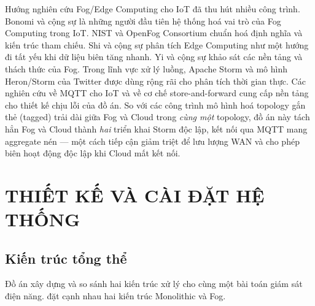 \documentclass[13pt,a4paper]{report}
\begin{document}
Hướng nghiên cứu Fog/Edge Computing cho IoT đã thu hút nhiều công trình. Bonomi
và cộng sự \cite{bonomi2012} là những người đầu tiên hệ thống hoá vai trò của Fog
Computing trong IoT. NIST \cite{nist2018} và OpenFog Consortium
\cite{openfog2017} chuẩn hoá định nghĩa và kiến trúc tham chiếu. Shi và cộng sự
\cite{shi2016} phân tích Edge Computing như một hướng đi tất yếu khi dữ liệu biên
tăng nhanh. Yi và cộng sự \cite{yi2015} khảo sát các nền tảng và thách thức của
Fog. Trong lĩnh vực xử lý luồng, Apache Storm \cite{storm} và mô hình
Heron/Storm của Twitter \cite{toshniwal2014} được dùng rộng rãi cho phân tích
thời gian thực. Các nghiên cứu về MQTT \cite{mqtt} cho IoT và về cơ chế
store-and-forward \cite{psaras2018} cung cấp nền tảng cho thiết kế chịu lỗi của
đồ án. So với các công trình mô hình hoá topology gắn thẻ (tagged) trải dài giữa
Fog và Cloud trong \textit{cùng một} topology, đồ án này tách hẳn Fog và Cloud
thành \textit{hai} triển khai Storm độc lập, kết nối qua MQTT mang aggregate nén
--- một cách tiếp cận giảm triệt để lưu lượng WAN và cho phép biên hoạt động độc
lập khi Cloud mất kết nối.

\chapter{THIẾT KẾ VÀ CÀI ĐẶT HỆ THỐNG}
\label{ch:thietke}

\section{Kiến trúc tổng thể}

Đồ án xây dựng và so sánh hai kiến trúc xử lý cho cùng một bài toán giám sát điện
năng.  đặt cạnh nhau hai kiến trúc Monolithic và Fog.
\end{document}
